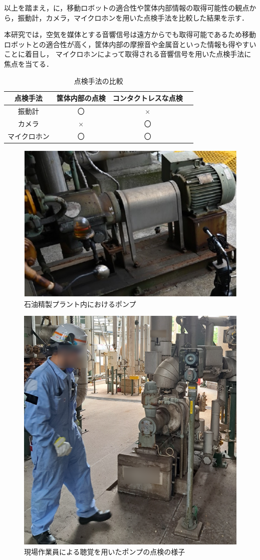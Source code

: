 \documentclass[../main]{subfiles}
\begin{document}
以上を踏まえ，に，移動ロボットの適合性や筐体内部情報の取得可能性の観点から，振動計，カメラ，マイクロホンを用いた点検手法を比較した結果を示す．

本研究では，空気を媒体とする音響信号は遠方からでも取得可能であるため移動ロボットとの適合性が高く，筐体内部の摩擦音や金属音といった情報も得やすいことに着目し，
マイクロホンによって取得される音響信号を用いた点検手法に焦点を当てる．



\begin{table}[htbp]
  \centering
  \caption{点検手法の比較}
  \label{tab:synthesis}
  \begin{tabular}{cccc}
  \toprule
  点検手法           & 筐体内部の点検& コンタクトレスな点検 \\ \hline
  振動計              & 〇                     & ×                   \\
  カメラ             & ×                     & 〇                   \\
  マイクロホン     & 〇                     & 〇                  \\ \bottomrule
  \end{tabular}
\end{table}

\begin{figure}[t]
  \centering
  \includegraphics[keepaspectratio, width=0.7\linewidth]{chap1/pump.pdf}
  \caption{石油精製プラント内におけるポンプ}
  \label{fig:pump}
\end{figure}

\begin{figure}[t]
  \centering
  \includegraphics[keepaspectratio, width=0.7\linewidth]{chap1/monitoring.png}
  \caption{現場作業員による聴覚を用いたポンプの点検の様子}
  \label{fig:monitoring}
\end{figure}
\end{document}
